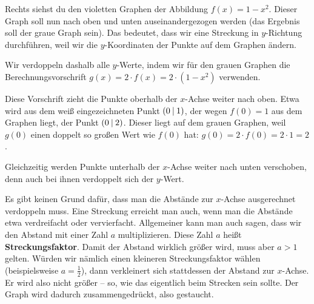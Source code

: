 \documentclass[../../main.tex]{subfiles}
\begin{document}
\begin{example}{}
    Rechts siehst du den violetten Graphen der Abbildung $f(x)=1-x^2$. Dieser Graph soll nun nach oben und unten auseinandergezogen werden (das Ergebnis soll der graue Graph sein). Das bedeutet, dass wir eine Streckung in $y$-Richtung durchführen, weil wir die $y$-Koordinaten der Punkte auf dem Graphen ändern.
    
    Wir verdoppeln dashalb alle $y$-Werte, indem wir für den grauen Graphen die Berechnungsvorschrift $g(x)=2\cdot f(x)=2\cdot(1-x^2)$ verwenden.
    
    Diese Vorschrift zieht die Punkte oberhalb der $x$-Achse weiter nach oben. Etwa wird aus dem weiß eingezeichneten Punkt $\left(0 \:\middle|\: 1\right)$, der wegen $f(0)=1$ aus dem Graphen liegt, der Punkt $\left(0 \:\middle|\: 2\right)$. Dieser liegt auf dem grauen Graphen, weil $g(0)$ einen doppelt so großen Wert wie $f(0)$ hat: $g(0)=2\cdot f(0)=2\cdot 1=2$.
    
    Gleichzeitig werden Punkte unterhalb der $x$-Achse weiter nach unten verschoben, denn auch bei ihnen verdoppelt sich der $y$-Wert.
\end{example}

Es gibt keinen Grund dafür, dass man die Abstände zur $x$-Achse ausgerechnet verdoppeln muss. Eine Streckung erreicht man auch, wenn man die Abstände etwa verdreifacht oder vervierfacht. Allgemeiner kann man auch sagen, dass wir den Abstand mit einer Zahl $a$ multiplizieren. Diese Zahl $a$ heißt \textbf{Streckungsfaktor}. Damit der Abstand wirklich größer wird, muss aber $a>1$ gelten. Würden wir nämlich einen kleineren Streckungsfaktor wählen (beispielsweise $a=\frac{1}{2}$), dann verkleinert sich stattdessen der Abstand zur $x$-Achse. Er wird also nicht größer -- so, wie das eigentlich beim Strecken sein sollte. Der Graph wird dadurch zusammengedrückt, also gestaucht.
\end{document}
